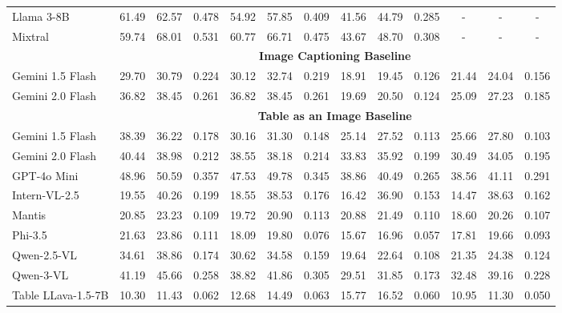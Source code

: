 \documentclass[11pt]{article}
\begin{document}
\begin{table}[t]
\begin{tabular}{lccc|ccc|ccc|ccc}
Llama 3-8B & 61.49 & 62.57 & 0.478 & 54.92 & 57.85 & 0.409 & 41.56 & 44.79 & 0.285 & - & - & - \\
Mixtral & 59.74 & 68.01 & 0.531 & 60.77 & 66.71 & 0.475 & 43.67 & 48.70 & 0.308 & - & - & - \\
\cmidrule{2-13}
& \multicolumn{12}{c}{\textbf{Image Captioning Baseline}} \\
\cmidrule{2-13}
Gemini 1.5 Flash & 29.70 & 30.79 & 0.224 & 30.12 & 32.74 & 0.219 & 18.91 & 19.45 & 0.126 & 21.44 & 24.04 & 0.156 \\
Gemini 2.0 Flash & \cellcolor{yellow}36.82 & \cellcolor{yellow}38.45 & \cellcolor{yellow}0.261 & \cellcolor{yellow}36.82 & \cellcolor{yellow}38.45 & \cellcolor{yellow}0.261 & \cellcolor{yellow}19.69 & \cellcolor{yellow}20.50 & \cellcolor{yellow}0.124 & \cellcolor{yellow}25.09 & \cellcolor{yellow}27.23 & \cellcolor{yellow}0.185 \\
\cmidrule{2-13}
& \multicolumn{12}{c}{\textbf{Table as an Image Baseline}} \\
\cmidrule{2-13}
Gemini 1.5 Flash & 38.39 & 36.22 & 0.178 & 30.16 & 31.30 & 0.148 & 25.14 & 27.52 & 0.113 & 25.66 & 27.80 & 0.103 \\
Gemini 2.0 Flash & 40.44 & 38.98 & 0.212 & 38.55 & 38.18 & 0.214 & 33.83 & 35.92 & 0.199 & 30.49 & 34.05 & 0.195 \\
GPT-4o Mini & \cellcolor{yellow}48.96 & \cellcolor{yellow}50.59 & \cellcolor{yellow}0.357 & \cellcolor{yellow}47.53 & \cellcolor{yellow}49.78 & \cellcolor{yellow}0.345 & \cellcolor{yellow}38.86 & \cellcolor{yellow}40.49 & \cellcolor{yellow}0.265 & \cellcolor{yellow}38.56 & \cellcolor{yellow}41.11 & \cellcolor{yellow}0.291 \\
Intern-VL-2.5 & 19.55 & 40.26 & 0.199 & 18.55 & 38.53 & 0.176 & 16.42 & 36.90 & 0.153 & 14.47 & 38.63 & 0.162 \\
Mantis & 20.85 & 23.23 & 0.109 & 19.72 & 20.90 & 0.113 & 20.88 & 21.49 & 0.110 & 18.60 & 20.26 & 0.107 \\
Phi-3.5 & 21.63 & 23.86 & 0.111 & 18.09 & 19.80 & 0.076 & 15.67 & 16.96 & 0.057 & 17.81 & 19.66 & 0.093 \\
Qwen-2.5-VL & 34.61 & 38.86 & 0.174 & 30.62 & 34.58 & 0.159 & 19.64 & 22.64 & 0.108 & 21.35 & 24.38 & 0.124 \\
Qwen-3-VL & 41.19 & 45.66 & 0.258 & 38.82 & 41.86 & 0.305 & 29.51 & 31.85 & 0.173 & 32.48 & 39.16 & 0.228 \\
Table LLava-1.5-7B & 10.30 & 11.43 & 0.062 & 12.68 & 14.49 & 0.063 & 15.77 & 16.52 & 0.060 & 10.95 & 11.30 & 0.050 \\

\end{tabular}
\end{table}
\end{document}
